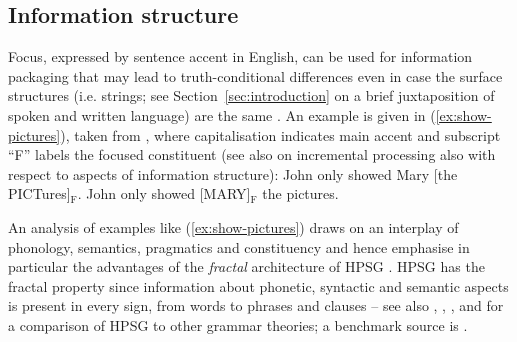 \documentclass[output=paper]{langsci/langscibook}
\begin{document}
{  
\subsection{Information structure}
\label{sec:information-structure}

Focus, expressed by sentence accent in English, can be used for information packaging that may lead to truth-conditional differences  even in case the surface structures (i.e. strings; see Section~\ref{sec:introduction} on a brief juxtaposition of spoken and written language) are the same \citep{Halliday:1967}.
%
An example is given in (\ref{ex:show-pictures}), taken from \citet[]{Krifka:2008}, where capitalisation indicates main accent and subscript \enquote{F} labels the focused constituent (see also  on incremental processing also with respect to aspects of information structure):
%
\ea \label{ex:show-pictures}
  \ea John only showed Mary [the PICTures]$_\text{F}$.
  \ex John only showed [MARY]$_\text{F}$ the pictures.
  \z
\z


An analysis of examples like (\ref{ex:show-pictures}) draws on an interplay of phonology, semantics, pragmatics and constituency and hence emphasise in particular the advantages of the \emph{fractal} architecture   of HPSG \citep{Johnson:Lappin:1999}. 
%
HPSG has the fractal property since
information about phonetic, syntactic and semantic aspects is present in every sign, from words to phrases and clauses \citep[]{Pollard:1997} -- see also , , ,  and  for a comparison of HPSG to other grammar theories; a benchmark source is \citealp{Mueller:2016}.


}
\end{document}

